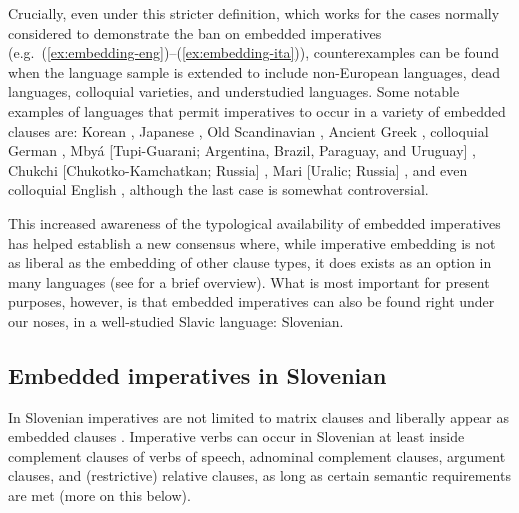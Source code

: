 \documentclass[output=paper,colorlinks,citecolor=brown]{langscibook}
\begin{document}
Crucially, even under this stricter definition, which works for the cases normally considered to demonstrate the ban on embedded imperatives (e.g.\ (\ref{ex:embedding-eng})--(\ref{ex:embedding-ita})), counterexamples can be found when the language sample is extended to include non-European languages, dead languages, colloquial varieties, and understudied languages. Some notable examples of languages that permit imperatives to occur in a variety of embedded clauses are: Korean \citep{portner07,pak-portner-zanuttini08}, Japanese \citep{oshima06,schwagerDISS}, Old Scandinavian \citep{roegnvaldssonMS}, Ancient Greek \citep{medeirosDISS}, colloquial German \citep{schwagerDISS,kaufmann-poschmannLang}, Mbyá [Tupi-Guarani; Argentina, Brazil, Paraguay, and Uruguay] \citep{thomasNELS}, Chukchi [Chukotko-Kamchatkan; Russia] \citep{naumov18}, Mari [Uralic; Russia] \citep{burukina24}, and even colloquial English \citep{crnic-trinhSUB,crnic-trinhNELS}, although the last case is somewhat controversial.

This increased awareness of the typological availability of embedded imperatives has helped establish a new consensus where, while imperative embedding is not as liberal as the embedding of other clause types, it does exists as an option in many languages (see \citealt{kaufmann21} for a brief overview).
What is most important for present purposes, however, is that embedded imperatives can also be found right under our noses, in a well-studied Slavic language: Slovenian. %


\subsection{Embedded imperatives in Slovenian}
\label{subsec:slo-emb-imp}
\largerpage

In Slovenian imperatives are not limited to matrix clauses and liberally appear as embedded clauses \citep{sheppardgolden02,bdvorak05,rus05,dvorakzimm08,stegoveckaufmann,starkl23}. Imperative verbs can occur in Slovenian at least inside complement clauses of verbs of speech, adnominal complement clauses, argument clauses, and (restrictive) relative clauses, as long as certain semantic requirements are met (more on this below).
\end{document}
